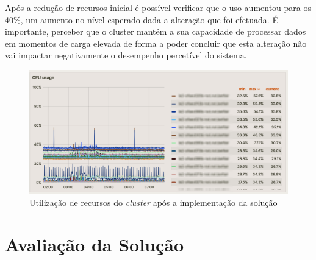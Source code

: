 Após a redução de recursos inicial é possível verificar que o uso aumentou para os 40\%, um aumento
no nível esperado dada a alteração que foi efetuada. É importante, perceber que o \gls{cluster}
mantém a sua capacidade de processar dados em momentos de carga elevada de forma a poder concluir
que esta alteração não vai impactar negativamente o desempenho percetível do sistema. 

\begin{figure}[H]
  \centerline{\includegraphics[scale=0.5]{media/content/impl/grafana-after.png}}
  \caption{Utilização de recursos do \textit{cluster} após a implementação da solução}
  \label{usage-after}
\end{figure}

\section{Avaliação da Solução}


